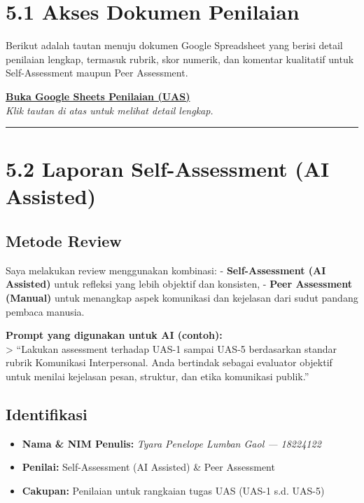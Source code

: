 \documentclass[
  letterpaper,
  DIV=11,
  numbers=noendperiod]{scrreprt}
\providecommand{\tightlist}{%
  \setlength{\itemsep}{0pt}\setlength{\parskip}{0pt}}
\begin{document}
\section{5.1 Akses Dokumen Penilaian}\label{akses-dokumen-penilaian}

Berikut adalah tautan menuju dokumen Google Spreadsheet yang berisi
detail penilaian lengkap, termasuk rubrik, skor numerik, dan komentar
kualitatif untuk Self-Assessment maupun Peer Assessment.

\href{https://docs.google.com/spreadsheets/d/1IibAuY3DjHINwNw4GhL184Wn0O4y-UdF91alpSOjYlA/edit?usp=sharing}{\textbf{Buka
Google Sheets Penilaian (UAS)}}\\
\emph{Klik tautan di atas untuk melihat detail lengkap.}

\begin{center}\rule{0.5\linewidth}{0.5pt}\end{center}

\section{5.2 Laporan Self-Assessment (AI
Assisted)}\label{laporan-self-assessment-ai-assisted}

\subsection{Metode Review}\label{metode-review}

Saya melakukan review menggunakan kombinasi: - \textbf{Self-Assessment
(AI Assisted)} untuk refleksi yang lebih objektif dan konsisten, -
\textbf{Peer Assessment (Manual)} untuk menangkap aspek komunikasi dan
kejelasan dari sudut pandang pembaca manusia.

\textbf{Prompt yang digunakan untuk AI (contoh):}\\
\textgreater{} ``Lakukan assessment terhadap UAS-1 sampai UAS-5
berdasarkan standar rubrik Komunikasi Interpersonal. Anda bertindak
sebagai evaluator objektif untuk menilai kejelasan pesan, struktur, dan
etika komunikasi publik.''

\subsection{Identifikasi}\label{identifikasi-1}

\begin{itemize}
\tightlist
\item
  \textbf{Nama \& NIM Penulis:} \emph{Tyara Penelope Lumban Gaol ---
  18224122}\\
\item
  \textbf{Penilai:} Self-Assessment (AI Assisted) \& Peer Assessment\\
\item
  \textbf{Cakupan:} Penilaian untuk rangkaian tugas UAS (UAS-1 s.d.
  UAS-5)
\end{itemize}
\end{document}
